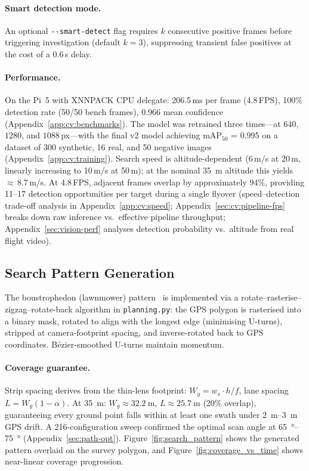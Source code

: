 \paragraph{Smart detection mode.} An optional \texttt{-{}-smart-detect} flag requires $k$ consecutive positive frames before triggering investigation (default $k{=}3$), suppressing transient false positives at the cost of a 0.6\,s delay.

\paragraph{Performance.} On the Pi~5 with XNNPACK CPU delegate: 206.5\,ms per frame (4.8\,FPS), 100\% detection rate (50/50 bench frames), 0.966 mean confidence (Appendix~\ref{app:cv:benchmarks}). The model was retrained three times---at $640$, $1280$, and $1088$\,px---with the final v2 model achieving mAP$_{50}$ = 0.995 on a dataset of 300 synthetic, 16 real, and 50 negative images (Appendix~\ref{app:cv:training}). Search speed is altitude-dependent (6\,m/s at 20\,m, linearly increasing to 10\,m/s at 50\,m); at the nominal \SI{35}{\metre} altitude this yields ${\approx}$\,8.7\,m/s. At 4.8\,FPS, adjacent frames overlap by approximately 94\%, providing 11--17 detection opportunities per target during a single flyover (speed--detection trade-off analysis in Appendix~\ref{app:cv:speed}; Appendix~\ref{sec:cv:pipeline-fps} breaks down raw inference vs.\ effective pipeline throughput; Appendix~\ref{sec:vision-perf} analyses detection probability vs.\ altitude from real flight video).

\subsection{Search Pattern Generation}\label{sec:search-pattern}

The boustrophedon (lawnmower) pattern~\cite{choset2001coverage} is implemented via a rotate--rasterise--zigzag--rotate-back algorithm in \texttt{planning.py}: the GPS polygon is rasterised into a binary mask, rotated to align with the longest edge (minimising U-turns), stripped at camera-footprint spacing, and inverse-rotated back to GPS coordinates. B\'{e}zier-smoothed U-turns maintain momentum.

\paragraph{Coverage guarantee.}
Strip spacing derives from the thin-lens footprint: $W_g = w_s \cdot h / f$, lane spacing $L = W_g(1 - \alpha)$. At \SI{35}{\metre}: $W_g \approx \SI{32.2}{\metre}$, $L \approx \SI{25.7}{\metre}$ (20\% overlap), guaranteeing every ground point falls within at least one swath under \SIrange{2}{3}{\metre} GPS drift. A 216-configuration sweep confirmed the optimal scan angle at \SIrange{65}{75}{\degree} (Appendix~\ref{sec:path-opt}). Figure~\ref{fig:search_pattern} shows the generated pattern overlaid on the survey polygon, and Figure~\ref{fig:coverage_vs_time} shows near-linear coverage progression.

